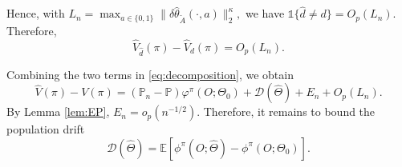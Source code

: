 \documentclass[12pt]{article}
\newcommand{\0}{\boldsymbol{0}}
\newcommand{\E}{\mathbb{E}}
\begin{document}
Hence, with
\(
L_n=\max_{a\in\{0,1\}}\|\delta \widehat \theta_{\widetilde A}(\cdot,a)\|_2^\kappa,
\)
we have
\(
\mathds 1\{\widehat d\neq d\}=O_p(L_n).
\)
Therefore,
\[
\widehat V_{\widehat d}(\pi)-\widehat V_d(\pi)=O_p(L_n).
\]

Combining the two terms in \eqref{eq:decomposition}, we obtain
\[
\widehat V(\pi)-V(\pi)=(\mathbb P_n-\mathbb P)\varphi^\pi(O;\Theta_0)+\mathcal D(\widehat\Theta)+E_n+O_p(L_n).
\]
By Lemma \ref{lem:EP}, $E_n =o_p(n^{-1/2})$.
Therefore, it remains to bound the population drift 
\[
\mathcal D(\widehat\Theta)=\E\left[\phi^\pi(O;\widehat\Theta)-\phi^\pi(O;\Theta_0)\right].
\]




\end{document}
